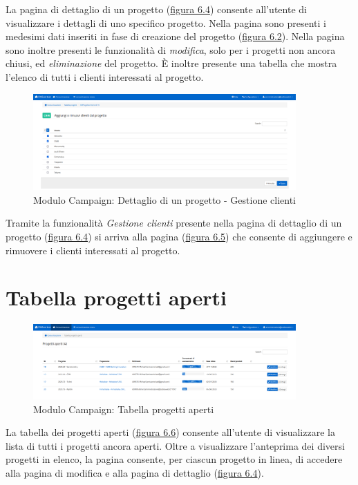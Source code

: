 \noindent La pagina di dettaglio di un progetto ({\hyperref[fig:dettaglioProgetto]{figura 6.4}}) consente all'utente di visualizzare i dettagli di uno specifico progetto. Nella pagina sono presenti i medesimi dati inseriti in fase di creazione del progetto ({\hyperref[fig:nuovoProgetto]{figura 6.2}}). Nella pagina sono inoltre presenti le funzionalità di \textit{modifica}, solo per i progetti non ancora chiusi, ed \textit{eliminazione} del progetto. È inoltre presente una tabella che mostra l'elenco di tutti i clienti interessati al progetto. 

\begin{figure}[!h]
\centering
\includegraphics[width=380px]{../images/UI/06-aggiungiRimuoviClienti.png}
\caption{Modulo Campaign: Dettaglio di un progetto - Gestione clienti}
\label{fig:gestioneClienti}
\end{figure}

\noindent Tramite la funzionalità \textit{Gestione clienti} presente nella pagina di dettaglio di un progetto ({\hyperref[fig:dettaglioProgetto]{figura 6.4}}) si arriva alla pagina ({\hyperref[fig:gestioneClienti]{figura 6.5}}) che consente di aggiungere e rimuovere i clienti interessati al progetto.

\pagebreak

\section{Tabella progetti aperti}
\begin{figure}[!h]
\centering
\includegraphics[width=380px]{../images/UI/07-tabellaProgettiAperti.png}
\caption{Modulo Campaign: Tabella progetti aperti}
\label{fig:tabellaProgettiAperti}
\end{figure}

\noindent La tabella dei progetti aperti ({\hyperref[fig:tabellaProgettiAperti]{figura 6.6}}) consente all'utente di visualizzare la lista di tutti i progetti ancora aperti. Oltre a visualizzare l'anteprima dei diversi progetti in elenco, la pagina consente, per ciascun progetto in linea, di accedere alla pagina di modifica e alla pagina di dettaglio ({\hyperref[fig:dettaglioProgetto]{figura 6.4}}).  


